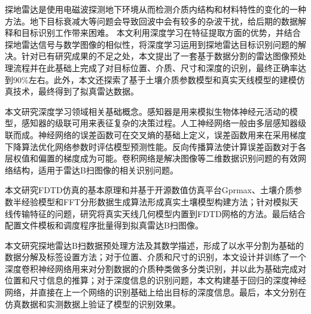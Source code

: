 \begin{chineseabstract}
探地雷达是使用电磁波探测地下环境从而检测介质内结构和材料特性的变化的一种方法。地下目标衰减大等问题会导致回波中会有较多的杂波干扰，给后期的数据解释和目标识别工作带来困难。
本文利用深度学习在特征提取方面的优势，并结合探地雷达信号与数学图像的相似性，将深度学习运用到探地雷达目标识别问题的解决。针对已有研究成果的不足之处，本文提出了一套基于数据分割的雷达图像预处理流程并在此基础上完成了对目标位置、介质、尺寸和深度的识别，最终正确率达到90\%左右。此外，本文还探索了基于土壤介质参数模型和真实天线模型的建模仿真技术，最终得到了拟真雷达数据。

本文研究深度学习领域相关基础概念。感知器是用来模拟生物体神经元活动的模型，感知器的级联可用来表征复杂的决策过程。人工神经网络一般由多层感知器级联而成。神经网络的误差函数可在交叉熵的基础上定义，误差函数用来在采用梯度下降算法优化网络参数时评估模型预测性能。反向传播算法使计算误差函数对于各层权值和偏置的梯度成为可能。卷积网络是解决图像等二维数据识别问题的有效网络结构，适用于雷达B扫图像的相关识别问题。

本文研究FDTD仿真的基本原理和并基于开源数值仿真平台Gprmax、土壤介质参数半经验模型和FFT分形数据生成算法形成真实土壤模型构建方法；针对模拟天线传输特征的问题，研究将真实天线几何模型内置到FDTD网格的方法。最后结合配置文件模板和调度程序批量得到拟真雷达B扫图像。

本文研究探地雷达B扫数据预处理方法及其数学描述，形成了以水平分割为基础的数据分解及标签设置方法；对于位置、介质和尺寸的识别，本文设计并训练了一个深度卷积神经网络用来对分割数据的介质种类做多分类识别，并以此为基础完成对位置和尺寸信息的推算；对于深度信息的识别问题，本文构建基于回归的深度神经网络，并直接在上一个网络的识别基础上给出目标的深度信息。最后，本文分别在仿真数据和实测数据上验证了模型的识别效果。

\end{chineseabstract}

